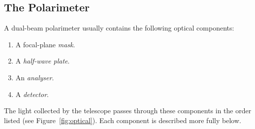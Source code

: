 \subsection{The Polarimeter}
A dual-beam polarimeter usually contains the following optical components:

\begin{enumerate}
\item A focal-plane {\em mask}.
\item A {\em half-wave plate}.
\item An {\em analyser}.
\item A {\em detector}.
\end{enumerate}

The light collected by the telescope passes through these components in
the order listed (see Figure~\ref{fig:optical}). Each component is
described more fully below.

